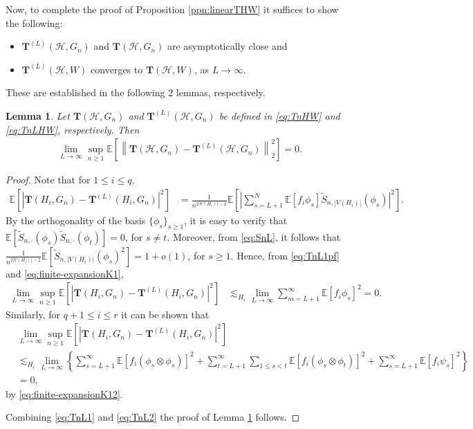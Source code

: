 \documentclass[11pt,reqno]{amsart}
\numberwithin{equation}{section}
\newcommand{\cH}{{\mathcal H}}
\newtheorem{lemma}{Lemma}[section]
\theoremstyle{definition}
\begin{document}
Now, to complete the proof of Proposition \ref{ppn:linearTHW} it suffices to show the following: 
\begin{itemize} 
\item[$(1)$] $\bm T^{(L)}(\mathcal H, G_n)$ and $ \bm T(\mathcal H, G_n)$ are asymptotically close and

\item[$(2)$] $\bm T^{(L)}(\mathcal H, W)$ converges to $\bm T(\mathcal H, W)$, as $L \rightarrow \infty$. 
\end{itemize}
These are established in the following 2 lemmas, respectively. 
\begin{lemma}\label{lemma:unif-n-convg}
Let $\bm T(\cH, G_n)$ and $\bm T^{(L)}(\cH, G_n)$ be defined in \eqref{eq:TnHW} and \eqref{eq:TnLHW}, respectively. Then 
\begin{align*}
 \lim_{L \rightarrow \infty}  \sup_{n \geq 1} \mathbb E \left[ \left\| \bm T(\cH, G_n) - \bm T^{(L)}(\cH, G_n) \right\|_2^2 \right] = 0. 
\end{align*}
\end{lemma}
\begin{proof}
Note that for $1 \leq i \leq q$, 
\begin{align}\label{eq:TnL1pf}
\mathbb E \left[ | \bm T(H_i, G_n) - \bm T^{(L)}(H_i, G_n) |^2 \right]  
 & =   \frac{1}{n^{2 |V(H_i)| -2}} \mathbb E \left[  \left |\sum_{s = L+1}^N \mathbb{E}\left[f_{i}\phi_{s}\right]\tilde{S}_{n,|V(H_i)|}\left(\phi_{s}\right) \right |^2 \right] . 
\end{align} 
By the orthogonality of the basis $\{ \phi_s\}_{s \geq 1}$, it is easy to verify that 
$\mathbb E[\tilde{S}_{n,\cdot}(\phi_s) \tilde{S}_{n,\cdot}(\phi_t)] = 0$, for $s \ne t$. Moreover, from \eqref{eq:SnL}, it follows that $\frac{1}{n^{2|V(H_i)| - 2 }}\mathbb E[\tilde S_{n,|V(H_i)|}(\phi_s)^2] = 1 + o(1)$, for $s \geq 1$. Hence, from \eqref{eq:TnL1pf} and \eqref{eq:finite-expansionK1}, 
\begin{align}\label{eq:TnL1}
\lim_{L \rightarrow \infty} \sup_{n \geq 1}\mathbb E \left[ | \bm T(H_i, G_n) - \bm T^{(L)}(H_i, G_n) |^2 \right]   & \lesssim_{H_i} \lim_{L \rightarrow \infty} \sum_{m=L+1}^{\infty}\mathbb{E}\left[f_{i}\phi_{s}\right]^2 = 0. 
\end{align}
Similarly, for $q+1 \leq i \leq r$ it can be shown that 
\begin{align}\label{eq:TnL2}
& \lim_{L \rightarrow \infty} \sup_{n \geq 1}\mathbb E \left[ | \bm T(H_i, G_n) - \bm T^{(L)}(H_i, G_n) |^2 \right]   \nonumber \\ 
& \lesssim_{H_i} \lim_{L \rightarrow \infty}  
\left\{ \sum_{s=L+1}^{\infty}\mathbb{E}\left[f_{i}(\phi_{s}\otimes\phi_{s})\right]^2
+  \sum_{t=L+1}^\infty \sum_{1 \leq s<t} \mathbb{E}\left[f_{i}(\phi_{s}\otimes\phi_{t})\right]^2 
+ \sum_{s=L+1}^{\infty}\mathbb{E}\left[f_{i}\psi_{s}\right]^2 \right\} \nonumber \\ 
& = 0 ,  
\end{align} 
by \eqref{eq:finite-expansionK12}. 

Combining \eqref{eq:TnL1} and \eqref{eq:TnL2} the proof of Lemma \ref{lemma:unif-n-convg} follows.  
\end{proof} 
\end{document}
